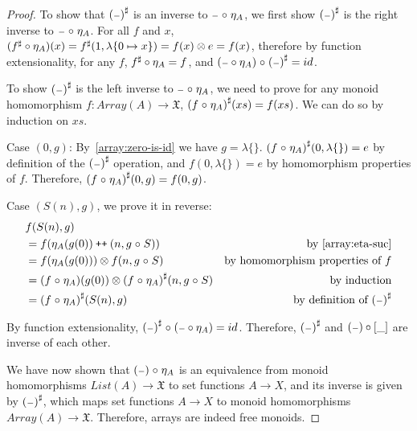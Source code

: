 \begin{proof}
    To show that ${({\scriptstyle{-}})}^{\sharp}$ is an inverse to ${\scriptstyle{-}} \mathrel{\circ} \eta_A$,
    we first show ${({\scriptstyle{-}})}^{\sharp}$ is the right inverse to ${\scriptstyle{-}} \mathrel{\circ} \eta_A$.
    For all $f$ and $x$, $({f}^{\sharp} \circ \eta_A)(x) = {f}^{\sharp}(1, \lambda\{0 \mapsto x\}) = f(x) \otimes e = f(x)$,
    therefore by function extensionality, for any $f$, ${f}^{\sharp} \circ \eta_A = f$,
    and $({\scriptstyle{-}} \circ \eta_A) \mathrel{\circ} {({\scriptstyle{-}})}^{\sharp} = id$.
    
    To show ${({\scriptstyle{-}})}^{\sharp}$ is the left inverse to ${\scriptstyle{-}} \mathrel{\circ} \eta_A$, we need to prove
    for any monoid homomorphism $f : Array(A) \to \mathfrak{X}$, ${(f \mathrel{\circ} \eta_A)}^{\sharp}(xs) = f(xs)$.
    We can do so by induction on $xs$.

    Case $(0, g)$:
    By~\ref{array:zero-is-id} we have $g = \lambda\{\}$.
    ${(f \mathrel{\circ} \eta_A)}^{\sharp}(0, \lambda\{\}) = e$ by definition of the ${({\scriptstyle{-}})}^{\sharp}$ operation,
    and $f(0, \lambda\{\}) = e$ by homomorphism properties of $f$.
    Therefore, ${(f \mathrel{\circ} \eta_A)}^{\sharp}(0, g) = f(0, g)$.

    Case $(S(n), g)$, we prove it in reverse: 
    \begin{align*}
        & f(S(n), g) \\
        & = f(\eta_A(g(0)) \mathbin{\text{\ttfamily\upshape ++}} (n, g \mathrel{\circ} S)) & \text{by~\ref{array:eta-suc}} \\
        & = f(\eta_A(g(0))) \otimes f(n, g \mathrel{\circ} S) & \text{by homomorphism properties of $f$} \\
        & = (f \mathrel{\circ} \eta_A)(g(0)) \otimes {(f \mathrel{\circ}\eta_A)}^{\sharp}(n, g \mathrel{\circ} S) & \text{by induction} \\
        & = {(f \mathrel{\circ} \eta_A)}^{\sharp}(S(n), g) & \text{by definition of ${({\scriptstyle{-}})}^{\sharp}$} 
    \end{align*}

    By function extensionality, ${({\scriptstyle{-}})}^{\sharp} \mathrel{\circ} ({\scriptstyle{-}} \circ \eta_A) = id$.
    Therefore, ${({\scriptstyle{-}})}^{\sharp}$ and $({\scriptstyle{-}}) \circ [\_]$ are inverse of each other.

    We have now shown that $({\scriptstyle{-}}) \mathrel{\circ} \eta_A$ is an equivalence from monoid homomorphisms $List(A) \to \mathfrak{X}$
    to set functions $A \to X$, and its inverse is given by ${({\scriptstyle{-}})}^{\sharp}$, which maps set
    functions $A \to X$ to monoid homomorphisms $Array(A) \to \mathfrak{X}$. Therefore, arrays are indeed
    free monoids.
    
\end{proof}

